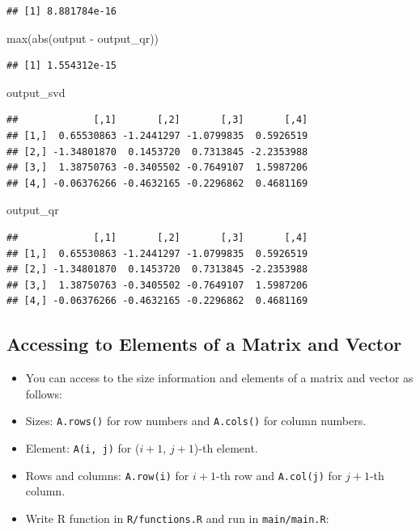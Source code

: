 \documentclass[
]{book}
\newenvironment{Shaded}{\begin{snugshade}}{\end{snugshade}}
\newcommand{\FunctionTok}[1]{\textcolor[rgb]{0.00,0.00,0.00}{#1}}
\newcommand{\NormalTok}[1]{#1}
\newcommand{\SpecialCharTok}[1]{\textcolor[rgb]{0.00,0.00,0.00}{#1}}
\begin{document}
\begin{verbatim}
## [1] 8.881784e-16
\end{verbatim}

\begin{Shaded}
\begin{Highlighting}[]
\FunctionTok{max}\NormalTok{(}\FunctionTok{abs}\NormalTok{(output }\SpecialCharTok{{-}}\NormalTok{ output\_qr))}
\end{Highlighting}
\end{Shaded}

\begin{verbatim}
## [1] 1.554312e-15
\end{verbatim}

\begin{Shaded}
\begin{Highlighting}[]
\NormalTok{output\_svd}
\end{Highlighting}
\end{Shaded}

\begin{verbatim}
##             [,1]       [,2]       [,3]       [,4]
## [1,]  0.65530863 -1.2441297 -1.0799835  0.5926519
## [2,] -1.34801870  0.1453720  0.7313845 -2.2353988
## [3,]  1.38750763 -0.3405502 -0.7649107  1.5987206
## [4,] -0.06376266 -0.4632165 -0.2296862  0.4681169
\end{verbatim}

\begin{Shaded}
\begin{Highlighting}[]
\NormalTok{output\_qr}
\end{Highlighting}
\end{Shaded}

\begin{verbatim}
##             [,1]       [,2]       [,3]       [,4]
## [1,]  0.65530863 -1.2441297 -1.0799835  0.5926519
## [2,] -1.34801870  0.1453720  0.7313845 -2.2353988
## [3,]  1.38750763 -0.3405502 -0.7649107  1.5987206
## [4,] -0.06376266 -0.4632165 -0.2296862  0.4681169
\end{verbatim}

\hypertarget{accessing-to-elements-of-a-matrix-and-vector}{%
\subsection{Accessing to Elements of a Matrix and Vector}\label{accessing-to-elements-of-a-matrix-and-vector}}

\begin{itemize}
\item
  You can access to the size information and elements of a matrix and vector as follows:
\item
  Sizes: \texttt{A.rows()} for row numbers and \texttt{A.cols()} for column numbers.
\item
  Element: \texttt{A(i,\ j)} for (\(i + 1\), \(j + 1\))-th element.
\item
  Rows and columns: \texttt{A.row(i)} for \(i + 1\)-th row and \texttt{A.col(j)} for \(j + 1\)-th column.
\item
  Write R function in \texttt{R/functions.R} and run in \texttt{main/main.R}:
\end{itemize}
\end{document}
